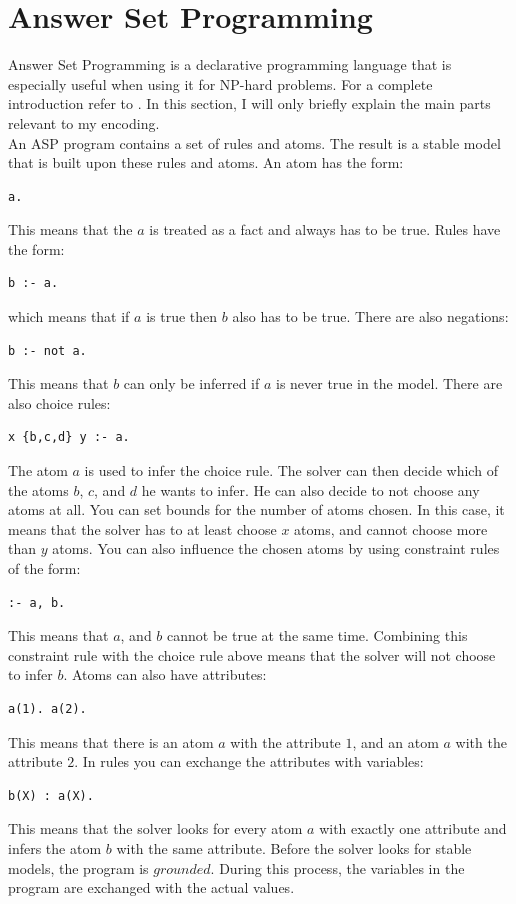 \documentclass[runningheads]{llncs}
\begin{document}
\section{Answer Set Programming}
Answer Set Programming is a declarative programming language that is especially useful when using it for NP-hard problems. For a complete introduction refer to \cite{asp}. In this section, I will only briefly explain the main parts relevant to my encoding. \\
An ASP program contains a set of rules and atoms. The result is a stable model that is built upon these rules and atoms. An atom has the form: 
\begin{verbatim}
a.
\end{verbatim}
This means that the $a$ is treated as a fact and always has to be true. Rules have the form:
\begin{verbatim}
b :- a.
\end{verbatim}
which means that if $a$ is true then $b$ also has to be true. There are also negations:
\begin{verbatim}
b :- not a.
\end{verbatim}
This means that $b$ can only be inferred if $a$ is never true in the model. There are also choice rules:
\begin{verbatim}
x {b,c,d} y :- a.
\end{verbatim}
The atom $a$ is used to infer the choice rule. The solver can then decide which of the atoms $b$, $c$, and $d$ he wants to infer. He can also decide to not choose any atoms at all. You can set bounds for the number of atoms chosen. In this case, it means that the solver has to at least choose $x$ atoms, and cannot choose more than $y$ atoms. You can also influence the chosen atoms by using constraint rules of the form:
\begin{verbatim}
:- a, b.
\end{verbatim}
This means that $a$, and $b$ cannot be true at the same time. Combining this constraint rule with the choice rule above means that the solver will not choose to infer $b$. Atoms can also have attributes:
\begin{verbatim}
a(1). a(2).
\end{verbatim}
This means that there is an atom $a$ with the attribute $1$, and an atom $a$ with the attribute $2$. In rules you can exchange the attributes with variables:
\begin{verbatim}
b(X) : a(X).
\end{verbatim}
This means that the solver looks for every atom $a$ with exactly one attribute and infers the atom $b$ with the same attribute. Before the solver looks for stable models, the program is $grounded$. During this process, the variables in the program are exchanged with the actual values. \\
\end{document}
